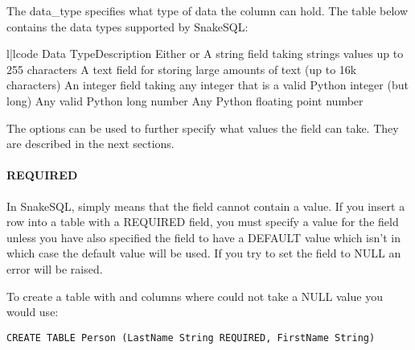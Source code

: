 \documentclass{howto}
\begin{document}
The data_type specifies what type of data the column can hold. The table below contains the data types supported by SnakeSQL:

\begin{tableii}{l|l}{code}%
  {Data Type}{Description}
      {Either  or }
    {A string field taking strings values up to 255 characters}
      {A text field for storing large amounts of text (up to 16k characters)}
   {An integer field taking any integer that is a valid Python integer (but  long)}
      {Any valid Python long number}
     {Any Python floating point number}
\end{tableii}

The options can be used to further specify what values the field can take. They are described in the next sections.

\paragraph{REQUIRED}

In SnakeSQL,  simply means that the field cannot contain a  value. If you insert a row into a table with a REQUIRED field, you must specify a value for the field unless you have also specified the field to have a DEFAULT value which isn't  in which case the default value will be used. If you try to set the field to NULL an error will be raised.

To create a table with  and  columns where  could not take a NULL value you would use:

\begin{verbatim}
CREATE TABLE Person (LastName String REQUIRED, FirstName String)
\end{verbatim}
\end{document}
